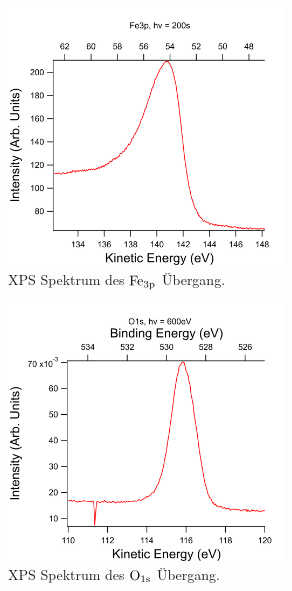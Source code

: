             \begin{figure}
                \centering
                \includegraphics[width=0.65\textwidth]{./content/pictures/FeO/Fe3p.png}
                \caption{XPS Spektrum des $\ce{Fe}_{3\text{p}}$ Übergang.}
                \label{fig:XPSFe3p}
            \end{figure}
            \begin{figure}
                \centering
                \includegraphics[width=0.65\textwidth]{./content/pictures/FeO/O1s.png}
                \caption{XPS Spektrum des $\ce{O}_{1\text{s}}$ Übergang.}
                \label{fig:XPSO1s}
            \end{figure}
